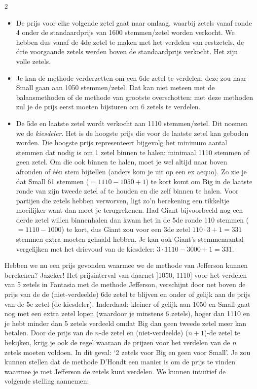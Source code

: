 \begin{multicols}{2}
\begin{itemize}
    \item De prijs voor elke volgende zetel gaat naar omlaag, waarbij zetels vanaf ronde 4 onder de standaardprijs van 1600 stemmen/zetel worden verkocht. We hebben dus vanaf de 4de zetel te maken met het verdelen van restzetels, de drie voorgaande zetels werden boven de standaardprijs verkocht. Het zijn volle zetels.

    \item Je kan de methode verderzetten om een 6de zetel te verdelen: deze zou naar Small gaan aan {\color{orange}1050} stemmen/zetel. Dat kan niet meteen met de balansmethoden of de methode van grootste overschotten: met deze methoden zul je de prijs eerst moeten bijsturen om 6 zetels te verdelen.

    \item De 5de en laatste zetel wordt verkocht aan {\color{cyan}1110} stemmen/zetel. Dit noemen we de {\color{cyan}\emph{kiesdeler}}. Het is de hoogste prijs die voor de laatste zetel kan geboden worden. Die hoogste prijs representeert bijgevolg het minimum aantal stemmen dat nodig is om 1 zetel binnen te halen: minimaal {\color{cyan}1110} stemmen of geen zetel. Om die ook binnen te halen, moet je wel altijd naar boven afronden of één stem bijtellen (anders kom je uit op een ex aequo). Zo zie je dat Small 61 stemmen ($= 1110-1050+1$) te kort komt om Big in de laatste ronde van zijn tweede zetel af te houden en die zelf binnen te halen. Voor partijen die zetels hebben verworven, ligt zo'n berekening een tikkeltje moeilijker want dan moet je terugrekenen. Had Giant bijvoorbeeld nog een derde zetel willen binnenhalen dan kwam het in de 5de ronde 110 stemmen ($=1110-1000$) te kort, dus Giant zou voor een 3de zetel $110\cdot3+1 = 331$ stemmen extra moeten gehaald hebben. Je kan ook Giant's stemmenaantal vergelijken met het drievoud van de kiesdeler: $3\cdot1110-3000+1 = 331$.
\end{itemize}
Hebben we nu een prijs gevonden waarmee we de methode van Jefferson kunnen berekenen? Jazeker! Het prijsinterval van daarnet ]{\color{orange}1050}, {\color{cyan}1110}] voor het verdelen van 5 zetels in Fantasia met de methode Jefferson, verschijnt door net boven {\color{orange}de prijs van de de (niet-verdeelde) 6de zetel} te blijven en onder of gelijk aan {\color{cyan}de prijs van de 5e zetel (de kiesdeler)}. Inderdaad: kleiner of gelijk aan {\color{orange}1050} en Small gaat nog met een extra zetel lopen (waardoor je minstens 6 zetels), hoger dan {\color{cyan}1110} en je hebt minder dan 5 zetels verdeeld omdat Big dan geen tweede zetel meer kan betalen. Door de prijs van de $n$-de zetel en (niet-verdeelde) ($n+1$)-de zetel te bekijken, krijg je ook de regel waaraan de prijzen voor het verdelen van de $n$ zetels moeten voldoen. In dit geval: `2 zetels voor Big en geen voor Small'. Je zou kunnen stellen dat de methode D'Hondt een manier is om de prijs te vinden waarmee je met Jefferson de zetels kunt verdelen. We kunnen intuïtief de volgende stelling aannemen:

\end{multicols}
